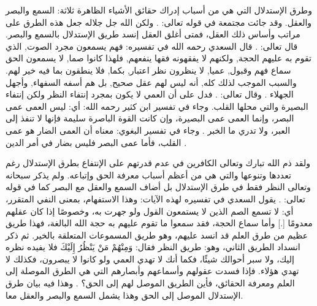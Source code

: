 وطرق الإستدلال التي هي من أسباب إدراك حقائق الأشياء الظاهرة ثلاثة: السمع والبصر والعقل. وقد جائت مجتمعة في قوله تعالى: \quranayah*[67][23]{\footnotesize \surahname*[67]}. ولكن الله جل جلاله جعل هذه الطرق على مراتب وأساس ذلك العقل، فمتى أغلق العقل إنسد طريق الإستدلال بالسمع والبصر. قال تعالى: 
\quranayah*[2][171]{\footnotesize \surahname*[2]}. قال السعدي رحمه الله في تفسيره: فهم يسمعون مجرد الصوت, الذي تقوم به عليهم الحجة, ولكنهم لا يفقهونه فقها ينفعهم, فلهذا كانوا صما, لا يسمعون الحق سماع فهم وقبول, عميا, لا ينظرون نظر اعتبار, بكما, فلا ينطقون بما فيه خير لهم. والسبب الموجب لذلك كله, أنه ليس لهم عقل صحيح, بل هم أسفه السفهاء, وأجهل الجهلاء \cite{tafsir_Saadi}. وقال تعالى: 
\quranayah*[22][46]{\footnotesize \surahname*[22]}. فدل على أن العمي لا يكون بمجرد إنتفاء النظر ولكن إنتفاء البصيرة والتي محلها القلب. وجاء في تفسير ابن كثير رحمه الله: أي: ليس العمى عمى البصر، وإنما العمى عمى البصيرة، وإن كانت القوة الباصرة سليمة فإنها لا تنفذ إلى العبر، ولا تدري ما الخبر \cite{tafsir_ibnKathir}. وجاء في تفسير البغوي: معناه أن العمى الضار هو عمى القلب، فأما عمى البصر فليس بضار في أمر الدين \cite{tafsir_Baghawi}. 

ولقد ذم الله تبارك وتعالى الكافرين في عدم قدرتهم على الإنتفاع بطرق الإستدلال رغم تعددها وتنوعها والتي هي من أعظم أسباب معرفة الحق وإتباعه. ولم يذكر سبحانه وتعالى النظر فقط في طرق الإستدلال بل أضاف السمع والعقل مع البصر كما في قوله تعالى: \quranayah*[10][42-43]{\footnotesize \surahname*[10]}. يقول السعدي في تفسيره لهذه الآيات: وهذا الاستفهام، بمعنى النفي المتقرر، أي: لا تسمع الصم الذين لا يستمعون القول ولو جهرت به، وخصوصًا إذا كان عقلهم معدومًا [.] وأما سماع الحجة، فقد سمعوا ما تقوم عليهم به حجة الله البالغة، فهذا طريق عظيم من طرق العلم قد انسد عليهم، وهو طريق المسموعات المتعلقة بالخير. ثم ذكر انسداد الطريق الثاني، وهو: طريق النظر فقال: {وَمِنْهُمْ مَنْ يَنْظُرُ إِلَيْكَ} فلا يفيده نظره إليك، ولا سبر أحوالك شيئًا، فكما أنك لا تهدي العمي ولو كانوا لا يبصرون، فكذلك لا تهدي هؤلاء. فإذا فسدت عقولهم وأسماعهم وأبصارهم التي هي الطرق الموصلة إلى العلم ومعرفة الحقائق، فأين الطريق الموصل لهم إلى الحق؟ \cite{tafsir_Saadi}. وهذا فيه بيان طرق الإستدلال الموصل إلى الحق وهذا يشمل السمع والبصر والعقل معا.

